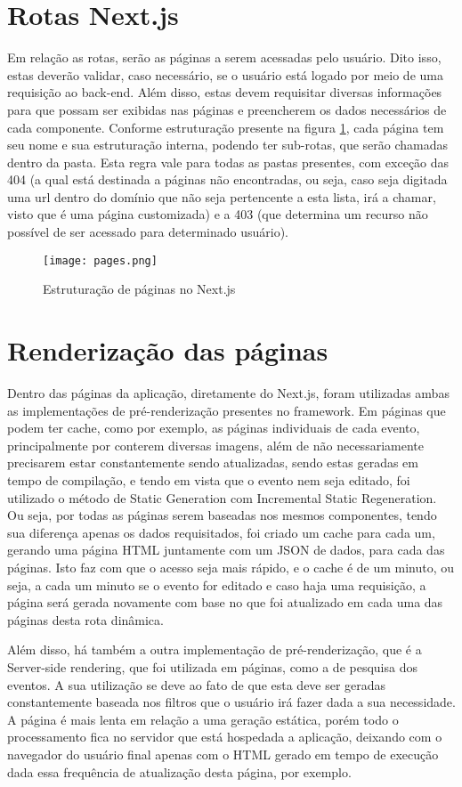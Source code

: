 \section{Rotas Next.js}
Em relação as rotas, serão as páginas a serem acessadas pelo usuário. Dito isso, estas deverão validar, caso necessário, se o usuário está logado por meio de uma requisição ao back-end. Além disso, estas devem requisitar diversas informações para que possam ser exibidas nas páginas e preencherem os dados necessários de cada componente. Conforme estruturação presente na figura \ref{pages}, cada página tem seu nome e sua estruturação interna, podendo ter sub-rotas, que serão chamadas dentro da pasta. Esta regra vale para todas as pastas presentes, com exceção das 404 (a qual está destinada a páginas não encontradas, ou seja, caso seja digitada uma url dentro do domínio que não seja pertencente a esta lista, irá a chamar, visto que é uma página customizada) e a 403 (que determina um recurso não possível de ser acessado para determinado usuário).
\begin{figure}[h]
    \caption{\label{pages}Estruturação de páginas no Next.js}
    \vspace{5pt}
    \centering
    \texttt{[image: pages.png]}
    \vspace{5pt}
\end{figure}

\section{Renderização das páginas}
Dentro das páginas da aplicação, diretamente do Next.js, foram utilizadas ambas as implementações de pré-renderização presentes no framework. Em páginas que podem ter cache, como por exemplo, as páginas individuais de cada evento, principalmente por conterem diversas imagens, além de não necessariamente precisarem estar constantemente sendo atualizadas, sendo estas geradas em tempo de compilação, e tendo em vista que o evento nem seja editado, foi utilizado o método de Static Generation com Incremental Static Regeneration. Ou seja, por todas as páginas serem baseadas nos mesmos componentes, tendo sua diferença apenas os dados requisitados, foi criado um cache para cada um, gerando uma página HTML juntamente com um JSON de dados, para cada das páginas. Isto faz com que o acesso seja mais rápido, e o cache é de um minuto, ou seja, a cada um minuto se o evento for editado e caso haja uma requisição, a página será gerada novamente com base no que foi atualizado em cada uma das páginas desta rota dinâmica.

Além disso, há também a outra implementação de pré-renderização, que é a Server-side rendering, que foi utilizada em páginas, como a de pesquisa dos eventos. A sua utilização se deve ao fato de que esta deve ser geradas constantemente baseada nos filtros que o usuário irá fazer dada a sua necessidade. A página é mais lenta em relação a uma geração estática, porém todo o processamento fica no servidor que está hospedada a aplicação, deixando com o navegador do usuário final apenas com o HTML gerado em tempo de execução dada essa frequência de atualização desta página, por exemplo.
